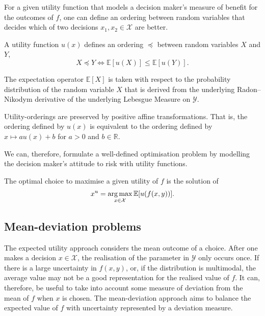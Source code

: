 \documentclass[main.tex]{subfiles}
\begin{document}
For a given utility function that models a decision maker's measure of
benefit for the outcomes of $f$, one can define an ordering
between random variables that decides which of two decisions
$x_1,x_2\in\mathcal{X}$ are better.
\begin{mydef}
  A utility function $u(x)$ defines an ordering $\preceq$ between random
  variables $X$ and $Y$,
  \begin{equation}
    X\preceq Y \Leftrightarrow \mathbb{E}[u(X)] \leq \mathbb{E}[u(Y)].
  \end{equation}
\end{mydef}
The expectation operator $\mathbb{E}[X]$ is taken with respect to the
probability distribution of the random variable $X$ that is derived
from the underlying Radon--Nikodym derivative of the underlying
Lebesgue Measure on $\mathcal{Y}$.

\begin{remark}
  Utility-orderings are preserved by positive affine transformations.
  That is, the ordering defined by $u(x)$ is equivalent to the
  ordering defined by $x\mapsto au(x)+b$ for  $a>0$ and $b\in\mathbb{R}$.
\end{remark}


We can, therefore, formulate a well-defined optimisation problem by
modelling the decision maker's attitude to risk with utility functions.

\begin{problem}
  The optimal choice to maximise a given utility of $f$ is the
  solution of
  \begin{align}
    x^u=\operatorname*{arg\,max}_{x\in\mathcal{X}} \mathbb{E}[u(f(x,y))].
  \end{align}
\end{problem}

\subsection{Mean-deviation problems}
The expected utility approach considers the mean outcome of a choice.
After one makes a decision $x\in\mathcal{X}$, the realisation of the
parameter in $\mathcal{Y}$ only occurs once. If there is a large
uncertainty in $f(x,y)$, or, if the distribution is multimodal, the
average value may not be a good representation for the realised value of $f$.
It can, therefore, be useful to take into account some measure of
deviation from the mean of $f$ when $x$ is chosen.
The mean-deviation approach aims to balance the expected value of $f$
with uncertainty represented by a deviation measure.
\end{document}
